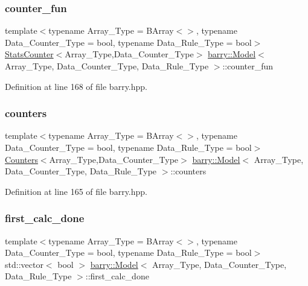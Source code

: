 \subsubsection{\texorpdfstring{counter\+\_\+fun}{counter\_fun}}
{\footnotesize\ttfamily template$<$typename Array\+\_\+\+Type  = B\+Array$<$$>$, typename Data\+\_\+\+Counter\+\_\+\+Type  = bool, typename Data\+\_\+\+Rule\+\_\+\+Type  = bool$>$ \\
\hyperlink{classbarry_1_1_stats_counter}{Stats\+Counter}$<$Array\+\_\+\+Type,Data\+\_\+\+Counter\+\_\+\+Type$>$ \hyperlink{classbarry_1_1_model}{barry\+::\+Model}$<$ Array\+\_\+\+Type, Data\+\_\+\+Counter\+\_\+\+Type, Data\+\_\+\+Rule\+\_\+\+Type $>$\+::counter\+\_\+fun}



Definition at line 168 of file barry.\+hpp.

\mbox{\label{classbarry_1_1_model_aea013a7ac325ece7564e8ea9cdf441a2}} 
\subsubsection{\texorpdfstring{counters}{counters}}
{\footnotesize\ttfamily template$<$typename Array\+\_\+\+Type  = B\+Array$<$$>$, typename Data\+\_\+\+Counter\+\_\+\+Type  = bool, typename Data\+\_\+\+Rule\+\_\+\+Type  = bool$>$ \\
\hyperlink{classbarry_1_1_counters}{Counters}$<$Array\+\_\+\+Type,Data\+\_\+\+Counter\+\_\+\+Type$>$ \hyperlink{classbarry_1_1_model}{barry\+::\+Model}$<$ Array\+\_\+\+Type, Data\+\_\+\+Counter\+\_\+\+Type, Data\+\_\+\+Rule\+\_\+\+Type $>$\+::counters}



Definition at line 165 of file barry.\+hpp.

\mbox{\label{classbarry_1_1_model_ae7b6def02fcb353830362713490c9825}} 
\subsubsection{\texorpdfstring{first\+\_\+calc\+\_\+done}{first\_calc\_done}}
{\footnotesize\ttfamily template$<$typename Array\+\_\+\+Type  = B\+Array$<$$>$, typename Data\+\_\+\+Counter\+\_\+\+Type  = bool, typename Data\+\_\+\+Rule\+\_\+\+Type  = bool$>$ \\
std\+::vector$<$ bool $>$ \hyperlink{classbarry_1_1_model}{barry\+::\+Model}$<$ Array\+\_\+\+Type, Data\+\_\+\+Counter\+\_\+\+Type, Data\+\_\+\+Rule\+\_\+\+Type $>$\+::first\+\_\+calc\+\_\+done}



